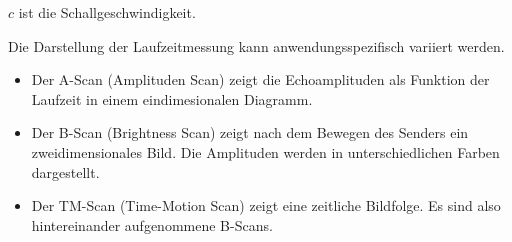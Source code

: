 $c$ ist die Schallgeschwindigkeit.

Die Darstellung der Laufzeitmessung kann anwendungsspezifisch variiert werden.

\begin{itemize}
  \item Der A-Scan (Amplituden Scan) zeigt die Echoamplituden als Funktion der
  Laufzeit in einem eindimesionalen Diagramm.

  \item Der B-Scan (Brightness Scan) zeigt nach dem Bewegen des Senders ein
  zweidimensionales Bild. Die Amplituden werden in unterschiedlichen Farben dargestellt.

  \item Der TM-Scan (Time-Motion Scan) zeigt eine zeitliche Bildfolge. Es sind also hintereinander
  aufgenommene B-Scans.
\end{itemize}


\cite{anleitung}
